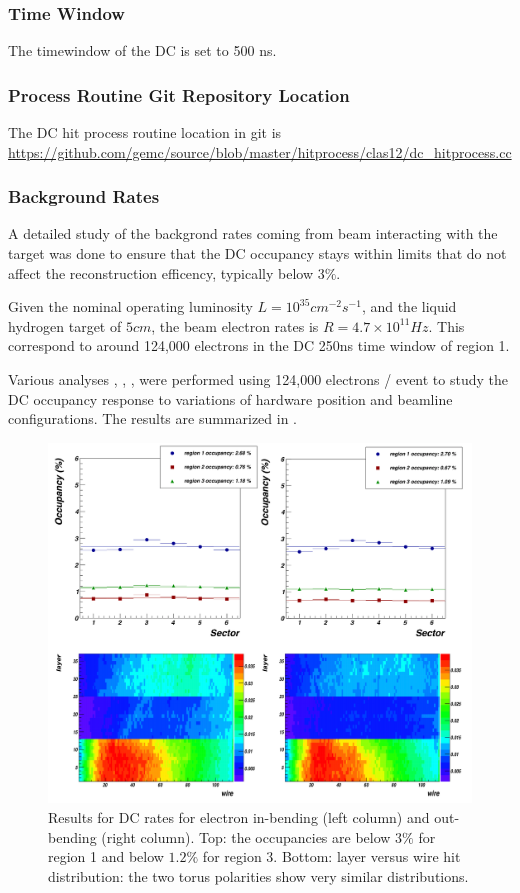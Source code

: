 \subsubsection{Time Window}

The timewindow of the DC is set to 500 ns.

\subsubsection{Process Routine Git Repository Location}
The DC hit process routine location in git is \url{https://github.com/gemc/source/blob/master/hitprocess/clas12/dc_hitprocess.cc}


\subsubsection{Background Rates}

A detailed study of the backgrond rates coming from beam interacting with the target was done to ensure that the DC occupancy stays
within limits that do not affect the reconstruction efficency, typically below $3\%$.

Given the nominal operating luminosity $L=10^{35} cm^{-2}s^{-1}$, and the liquid hydrogen target of $5 cm$, the beam electron rates
is $R=4.7 \times 10^{11} Hz$. This correspond to around 124,000 electrons in the DC 250ns time window of region 1.

Various analyses \cite{targetStudy}, \cite{clas12Beamline}, \cite{clas12Background}, were performed using 124,000 electrons / event
to study the DC occupancy response to variations of hardware position and beamline configurations.
The results are summarized in .

\begin{figure}
	\centering
	\includegraphics[width=0.95\columnwidth,keepaspectratio]{img/dcOccupancy.png}
	\caption{Results for DC rates for electron in-bending (left column) and out-bending (right column).
				Top: the occupancies are below $3\%$ for region 1 and below $1.2\%$ for region 3. Bottom: layer
				versus wire hit distribution: the two torus polarities show very similar distributions.}
	\label{fig:dcOccupancy}
\end{figure}

